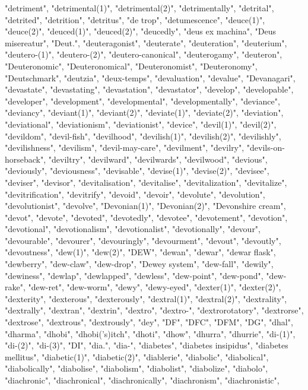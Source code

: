 "detriment",
"detrimental(1)",
"detrimental(2)",
"detrimentally",
"detrital",
"detrited",
"detrition",
"detritus",
"de trop",
"detumescence",
"deuce(1)",
"deuce(2)",
"deuced(1)",
"deuced(2)",
"deucedly",
"deus ex machina",
"Deus misereatur",
"Deut.",
"deuteragonist",
"deuterate",
"deuteration",
"deuterium",
"deutero-(1)",
"deutero-(2)",
"deutero-canonical",
"deuterogamy",
"deuteron",
"Deuteronomic",
"Deuteronomical",
"Deuteronomist",
"Deuteronomy",
"Deutschmark",
"deutzia",
"deux-temps",
"devaluation",
"devalue",
"Devanagari",
"devastate",
"devastating",
"devastation",
"devastator",
"develop",
"developable",
"developer",
"development",
"developmental",
"developmentally",
"deviance",
"deviancy",
"deviant(1)",
"deviant(2)",
"deviate(1)",
"deviate(2)",
"deviation",
"deviational",
"deviationism",
"deviationist",
"device",
"devil(1)",
"devil(2)",
"devildom",
"devil-fish",
"devilhood",
"devilish(1)",
"devilish(2)",
"devilishly",
"devilishness",
"devilism",
"devil-may-care",
"devilment",
"devilry",
"devils-on-horseback",
"deviltry",
"devilward",
"devilwards",
"devilwood",
"devious",
"deviously",
"deviousness",
"devisable",
"devise(1)",
"devise(2)",
"devisee",
"deviser",
"devisor",
"devitalisation",
"devitalise",
"devitalization",
"devitalize",
"devitrification",
"devitrify",
"devoid",
"devoir",
"devolute",
"devolution",
"devolutionist",
"devolve",
"Devonian(1)",
"Devonian(2)",
"Devonshire cream",
"devot",
"devote",
"devoted",
"devotedly",
"devotee",
"devotement",
"devotion",
"devotional",
"devotionalism",
"devotionalist",
"devotionally",
"devour",
"devourable",
"devourer",
"devouringly",
"devourment",
"devout",
"devoutly",
"devoutness",
"dew(1)",
"dew(2)",
"DEW",
"dewan",
"dewar",
"dewar flask",
"dewberry",
"dew-claw",
"dew-drop",
"Dewey system",
"dew-fall",
"dewily",
"dewiness",
"dewlap",
"dewlapped",
"dewless",
"dew-point",
"dew-pond",
"dew-rake",
"dew-ret",
"dew-worm",
"dewy",
"dewy-eyed",
"dexter(1)",
"dexter(2)",
"dexterity",
"dexterous",
"dexterously",
"dextral(1)",
"dextral(2)",
"dextrality",
"dextrally",
"dextran",
"dextrin",
"dextro",
"dextro-",
"dextrorotatory",
"dextrorse",
"dextrose",
"dextrous",
"dextrously",
"dey",
"DF",
"DFC",
"DFM",
"DG",
"dhal",
"dharma",
"dhobi",
"dhobi('s)itch",
"dhoti",
"dhow",
"dhurra",
"dhurrie",
"di-(1)",
"di-(2)",
"di-(3)",
"DI",
"dia.",
"dia-",
"diabetes",
"diabetes insipidus",
"diabetes mellitus",
"diabetic(1)",
"diabetic(2)",
"diablerie",
"diabolic",
"diabolical",
"diabolically",
"diabolise",
"diabolism",
"diabolist",
"diabolize",
"diabolo",
"diachronic",
"diachronical",
"diachronically",
"diachronism",
"diachronistic",
